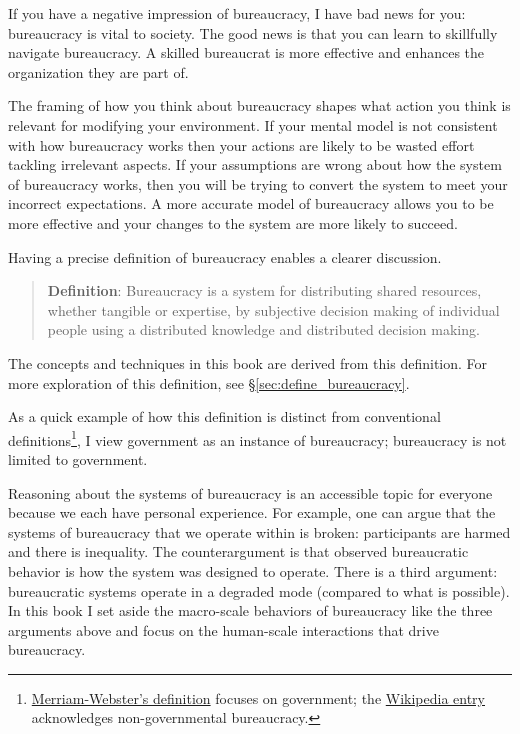 

If you have a negative impression of bureaucracy, I have bad news for you: bureaucracy is vital to society. The good news is that you can learn to skillfully navigate bureaucracy. A skilled bureaucrat is more effective and enhances the organization they are part of.

The framing of how you think about bureaucracy shapes what action you think is relevant for modifying your environment. If your mental model is not consistent with how bureaucracy works then your actions are likely to be wasted effort tackling irrelevant aspects. If your assumptions are wrong about how the system of bureaucracy works, then you will be trying to convert the system to meet your incorrect expectations. 
A more accurate model of bureaucracy allows you to be more effective and your changes to the system are more likely to succeed. 

Having a precise definition of bureaucracy enables a clearer discussion. 

\begin{quote}
\textbf{Definition}: Bureaucracy is a system for distributing shared resources, whether tangible or expertise, by subjective decision making of individual people using a distributed knowledge and distributed decision making. 
\end{quote}

The concepts and techniques in this book are derived from this definition. For more exploration of this definition, see \S\ref{sec:define_bureaucracy}.

As a quick example of how this definition is distinct from conventional definitions\footnote{\href{https://www.merriam-webster.com/dictionary/bureaucracy}{Merriam-Webster's definition} focuses on government; the \href{https://www.merriam-webster.com/dictionary/bureaucracy}{Wikipedia entry} acknowledges non-governmental bureaucracy.}, I view government as an instance of bureaucracy; bureaucracy is not limited to government. 

Reasoning about the systems of bureaucracy is an accessible topic for everyone because we each have personal experience.
For example, one can argue that the systems of bureaucracy that we operate within is broken: participants are harmed and there is inequality. The counterargument is that observed bureaucratic behavior is how the system was designed to operate. There is a third argument: bureaucratic systems operate in a degraded mode (compared to what is possible). In this book I set aside the macro-scale behaviors of bureaucracy like the three arguments above and
focus on the human-scale interactions that drive bureaucracy.

